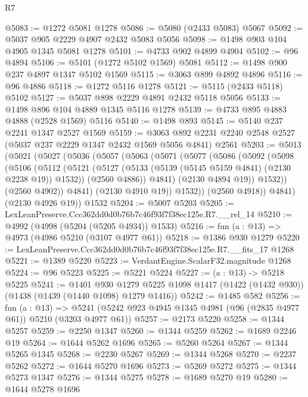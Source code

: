 \begin{lexlean}{R7}
\begin{coremodule}
@5083 := @1272 @5081 @1278
@5086 := @5080 (@2433 @5083) @5067
@5092 := @5037 @905 @2229 @4907 @2432 @5083 @5056
@5098 := @1498 @903 @104 @4905 @1345 @5081 @1278
@5101 := @4733 @902 @4899 @4904
@5102 := @96 @4894
@5106 := @5101 (@1272 @5102 @1569) @5081
@5112 := @1498 @900 @237 @4897 @1347 @5102 @1569
@5115 := @3063 @899 @4892 @4896
@5116 := @96 @4886
@5118 := @1272 @5116 @1278
@5121 := @5115 (@2433 @5118) @5102
@5127 := @5037 @898 @2229 @4891 @2432 @5118 @5056
@5133 := @1498 @896 @104 @4889 @1345 @5116 @1278
@5139 := @4733 @895 @4883 @4888 (@2528 @1569) @5116
@5140 := @1498 @893
@5145 := @5140 @237 @2241 @1347 @2527 @1569
@5159 := @3063 @892 @2231 @2240 @2548 @2527 (@5037 @237 @2229 @1347 @2432 @1569 @5056 @4841) @2561
@5203 := @5013
    (@5021
      (@5027
        (@5036
          (@5057
            (@5063
              (@5071
                (@5077
                  (@5086
                    (@5092
                      (@5098
                        (@5106
                          (@5112
                            (@5121
                              (@5127 (@5133 (@5139 (@5145 @5159 @4841) (@2130 @2238 @19)) @1532))
                              (@2560 @4886))
                            @4841)
                          (@2130 @4894 @19))
                        @1532))
                    (@2560 @4902))
                  @4841)
                (@2130 @4910 @19))
              @1532))
          (@2560 @4918))
        @4841)
      (@2130 @4926 @19))
    @1532
@5204 := @5007 @5203
@5205 := LexLeanPreserve.Ccc362dd0d0b76b7c46f93f7f38ec125e.R7.__rel_14
@5210 := @4992 (@4998 (@5204 (@5205 @4934)) @1533)
@5216 := fun (a : @13) => @4973 (@4986 @5210 (@3107 @4977 @61))
@5218 := @1386 @930 @1279
@5220 := LexLeanPreserve.Ccc362dd0d0b76b7c46f93f7f38ec125e.R7.__fits_17 @1268
@5221 := @1389 @5220
@5223 := VerdantEngine.ScalarF32.magnitude @1268
@5224 := @96 @5223
@5225 := @5221 @5224
@5227 := (a : @13) -> @5218 @5225
@5241 := @1401
    @930
    @1279
    @5225
    @1098
    @1417
    (@1422 (@1432 @930))
    (@1438 (@1439 (@1440 @1098) @1279 @1416))
@5242 := @1485 @582
@5256 := fun (a : @13) =>
  @5241 (@5242 @923 @4945 @1345 @4981 (@96 (@2835 @4977 @61)) @5210 (@3203 @4977 @61))
@5257 := @2173 @5220
@5258 := @1344 @5257
@5259 := @2250 @1347
@5260 := @1344 @5259
@5262 := @1689 @2246 @19
@5264 := @1644 @5262 @1696
@5265 := @5260 @5264
@5267 := @1344 @5265 @1345
@5268 := @2230 @5267
@5269 := @1344 @5268
@5270 := @2237 @5262
@5272 := @1644 @5270 @1696
@5273 := @5269 @5272
@5275 := @1344 @5273 @1347
@5276 := @1344 @5275
@5278 := @1689 @5270 @19
@5280 := @1644 @5278 @1696

\end{coremodule}
\end{lexlean}
